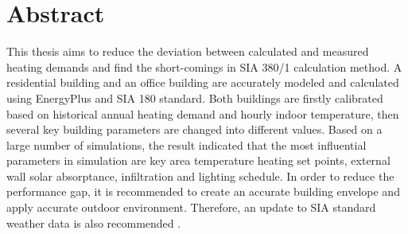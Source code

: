 




 \setcounter{tocdepth}{2}
 \tableofcontents

 \cleardoublepage


\chapter*{Abstract}
    This thesis aims to reduce the deviation between calculated and measured heating demands and find the short-comings in SIA 380/1 calculation method. A residential building and an office building are accurately modeled and calculated using EnergyPlus and SIA 180 standard. Both buildings are firstly calibrated based on historical annual heating demand and hourly indoor temperature, then several key building parameters are changed into different values. Based on a large number of simulations, the result indicated that the most influential parameters in simulation are key area temperature heating set points, external wall solar absorptance, infiltration and lighting schedule. In order to reduce the performance gap, it is recommended to create an accurate building envelope and apply accurate outdoor environment. Therefore, an update to SIA standard weather data is also recommended \cite{FREI2017421}.


 \cleardoublepage


